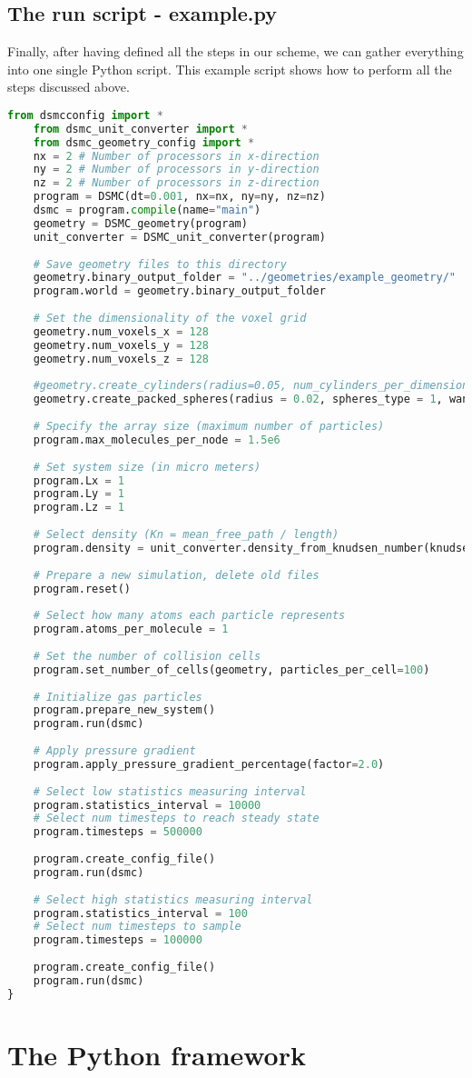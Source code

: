 \subsection{The run script - example.py}
Finally, after having defined all the steps in our scheme, we can gather everything into one single Python script. This example script shows how to perform all the steps discussed above. 
\begin{lstlisting}[caption=example.py, label=lst:dsmc_example_script, language=Python]
	from dsmcconfig import *
	from dsmc_unit_converter import *
	from dsmc_geometry_config import *
	nx = 2 # Number of processors in x-direction
	ny = 2 # Number of processors in y-direction
	nz = 2 # Number of processors in z-direction
	program = DSMC(dt=0.001, nx=nx, ny=ny, nz=nz)
	dsmc = program.compile(name="main")
	geometry = DSMC_geometry(program)
	unit_converter = DSMC_unit_converter(program)
	
	# Save geometry files to this directory
	geometry.binary_output_folder = "../geometries/example_geometry/"
	program.world = geometry.binary_output_folder
	
	# Set the dimensionality of the voxel grid
	geometry.num_voxels_x = 128
	geometry.num_voxels_y = 128
	geometry.num_voxels_z = 128
	
	#geometry.create_cylinders(radius=0.05, num_cylinders_per_dimension = 4)
	geometry.create_packed_spheres(radius = 0.02, spheres_type = 1, wanted_porosity = 0.5)
	
	# Specify the array size (maximum number of particles)
	program.max_molecules_per_node = 1.5e6
	
	# Set system size (in micro meters)
	program.Lx = 1
	program.Ly = 1
	program.Lz = 1
	
	# Select density (Kn = mean_free_path / length)
	program.density = unit_converter.density_from_knudsen_number(knudsen_number=1.0, length=program.Ly)
	
	# Prepare a new simulation, delete old files
	program.reset()
	
	# Select how many atoms each particle represents
	program.atoms_per_molecule = 1
	
	# Set the number of collision cells
	program.set_number_of_cells(geometry, particles_per_cell=100)
	
	# Initialize gas particles
	program.prepare_new_system()
	program.run(dsmc)
	
	# Apply pressure gradient
	program.apply_pressure_gradient_percentage(factor=2.0)
	
	# Select low statistics measuring interval
	program.statistics_interval = 10000
	# Select num timesteps to reach steady state
	program.timesteps = 500000
	
	program.create_config_file()
	program.run(dsmc)
	
	# Select high statistics measuring interval
	program.statistics_interval = 100
	# Select num timesteps to sample
	program.timesteps = 100000
	
	program.create_config_file()
	program.run(dsmc)
}
\end{lstlisting}
\section{The Python framework}